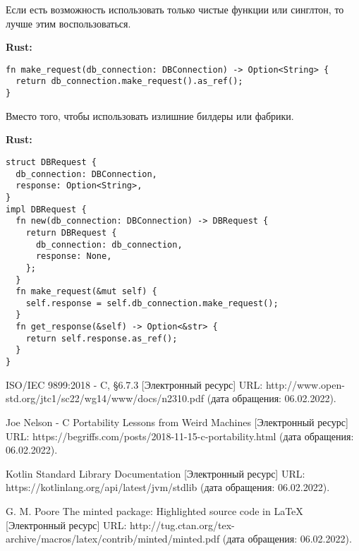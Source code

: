 \documentclass[12p]{article}
\begin{document}
Если есть возможность использовать только чистые функции или синглтон, то лучше этим воспользоваться.\newline

\textbf{Rust:}
\begin{verbatim}
fn make_request(db_connection: DBConnection) -> Option<String> {
  return db_connection.make_request().as_ref();
}
\end{verbatim}

Вместо того, чтобы использовать излишние билдеры или фабрики.\newline

\textbf{Rust:}
\begin{verbatim}
struct DBRequest {
  db_connection: DBConnection,
  response: Option<String>,
}
impl DBRequest {
  fn new(db_connection: DBConnection) -> DBRequest {
    return DBRequest {
      db_connection: db_connection,
      response: None,
    };
  }
  fn make_request(&mut self) {
    self.response = self.db_connection.make_request();
  }
  fn get_response(&self) -> Option<&str> {
    return self.response.as_ref();
  }
}
\end{verbatim}

\begin{thebibliography}{}

ISO/IEC 9899:2018 - C, \S6.7.3 [Электронный ресурс] URL: http://www.open-std.org/jtc1/sc22/wg14/www/docs/n2310.pdf (дата обращения: 06.02.2022).

Joe Nelson - C Portability Lessons from Weird Machines [Электронный ресурс] URL: https://begriffs.com/posts/2018-11-15-c-portability.html (дата обращения: 06.02.2022).

Kotlin Standard Library Documentation [Электронный ресурс] URL: https://kotlinlang.org/api/latest/jvm/stdlib (дата обращения: 06.02.2022).

G. M. Poore The minted package: Highlighted source code in LaTeX [Электронный ресурс] URL: http://tug.ctan.org/tex-archive/macros/latex/contrib/minted/minted.pdf (дата обращения: 06.02.2022).

\end{thebibliography}
\end{document}
